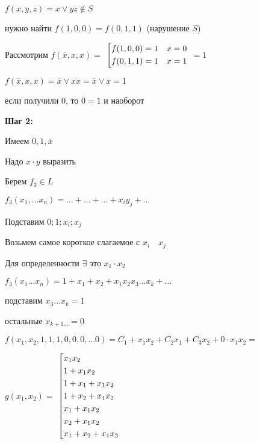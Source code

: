 \documentclass[russian]{lecture-notes}
\begin{document}
    \begin{example}
        $f(x, y, z) = x \lor yz \notin S$

        нужно найти $f(1, 0, 0) = f(0, 1, 1)$ (нарушение $S$)

        Рассмотрим $f(\overline{x}, x, x) = $
        $\left[
        \begin{gathered}
            f(1, 0, 0) = 1 \quad x = 0 \hfill
            \\
            f(0, 1, 1) = 1 \quad x = 1 \hfill
            \\
        \end{gathered}
        \right.$
        $ = 1$

        $f(\overline{x}, x, x) = \overline{x} \lor xx = \overline{x} \lor x = 1$

        если получили 0, то $\overline{0} = 1$ и наоборот
    \end{example}

    \textbf{Шаг 2:}

    Имеем $0, 1, \overline{x}$

    Надо $x \cdot y$ выразить

    Берем $f_3 \in L$

    $f_3(x_1, \dots x_n) = \dots + \dots + \dots + x_iy_j + \dots$

    Подставим $0; 1; x_i; x_j$

    Возьмем самое короткое слагаемое с $x_i \quad x_j$

    Для определенности $\exists$ это $x_1 \cdot x_2$

    $f_3(x_1 \dots x_n) = 1 + x_1 + x_2 + x_1x_2x_3\dots x_k + \dots$

    подставим $x_3 \dots x_k = 1$

    остальные $x_{k+1 \dots} = 0$

    $f(x_1, x_2, 1, 1, 1, 0, 0, 0, \dots 0) = C_1 + x_1x_2 + C_2x_1 + C_3x_2 + 0 \cdot x_1x_2 = $

    $g(x_1, x_2) = $
    $\left[
    \begin{gathered}
        x_1 x_2 \hfill
        \\
        1 + x_1 x_2 \hfill
        \\
        1 + x_1 + x_1 x_2 \hfill
        \\
        1 + x_2 + x_1 x_2 \hfill
        \\
        x_1 + x_1 x_2 \hfill
        \\
        x_2 + x_1 x_2 \hfill
        \\
        x_1 + x_2 + x_1 x_2 \hfill
        \\
    \end{gathered}
    \right.$
\end{document}
